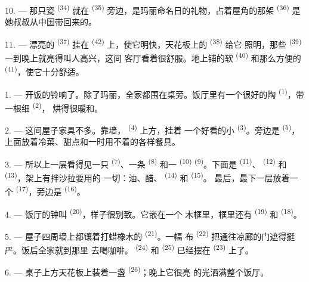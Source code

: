 10. --- 那只瓷 \textsuperscript{(34)} 就在
\textsuperscript{(35)} 旁边，是玛丽命名日的礼物，占着屋角的那架
\textsuperscript{(36)} 是她叔叔从中国带回来的。

11. --- 漂亮的 \textsuperscript{(37)} 挂在
\textsuperscript{(42)} 上，使它明快，天花板上的 \textsuperscript{(38)} 给它
照明，那些 \textsuperscript{(39)} 一到晚上就亮得叫人高兴，这间
客厅看着很舒服。地上铺的软 \textsuperscript{(40)} 和那么方便的
 \textsuperscript{(41)}，使它十分舒适。

\VUsaut{3.6mm}
\VUsaut{3.0mm}

1. --- 开饭的铃响了。除了玛丽，全家都围在桌旁。饭厅里有一个很好的陶
 \textsuperscript{(1)}，带一根细 \textsuperscript{(2)}，
烘得很暖和。

2. --- 这间屋子家具不多。靠墙， \textsuperscript{(4)} 上方，挂着
一个好看的小 \textsuperscript{(3)}。旁边是
\textsuperscript{(5)}，上面放着冷菜、甜点和一时用不着的各样餐具。

3. --- 所以上一层看得见一只 \textsuperscript{(7)}、一条
\textsuperscript{(8)} 和一 \textsuperscript{(10)} 
\textsuperscript{(9)}。下面是 \textsuperscript{(11)}、
\textsuperscript{(12)} 和 \textsuperscript{(13)}，架上有拌沙拉要用的
一切：油、醋、 \textsuperscript{(14)} 和 \textsuperscript{(15)}。
最后，最下一层放着一个 \textsuperscript{(17)}，旁边是
\textsuperscript{(16)}。

4. --- 饭厅的钟叫 \textsuperscript{(20)}，样子很别致。它嵌在一个
木框里，框里还有 \textsuperscript{(19)} 和
\textsuperscript{(18)}。

\VUsaut{4.6mm}
\VUsaut{3.0mm}

5. --- 屋子四周墙上都镶着打蜡橡木的 \textsuperscript{(21)}。一幅
布 \textsuperscript{(22)} 把通往凉廊的门遮得挺严。饭后全家就到那里
去喝咖啡。 \textsuperscript{(24)} 和 \textsuperscript{(25)}
已经摆在 \textsuperscript{(23)} 上了。

6. --- 桌子上方天花板上装着一盏 \textsuperscript{(26)}；晚上它很亮
的光洒满整个饭厅。


